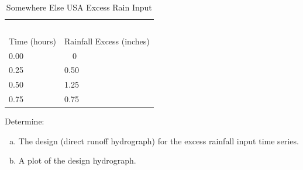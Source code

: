 \documentclass[12pt]{article}
\begin{document}
\begin{enumerate}
\begin{table}[h!]
\centering
\caption{Somewhere Else USA Excess Rain Input}
\begin{tabular}{p{2.0in}p{2.0in}} %
~&~\\
Time (hours) & Rainfall Excess (inches) \\
\hline
\hline
0.00 & ~~0 \\
0.25 & 0.50 \\
0.50 & 1.25 \\
0.75 & 0.75 \\
\hline
\end{tabular}
\label{tab:SomewhereElseUSAExcessRain}
\end{table}

Determine:
    \begin{enumerate}[a)]
        \item The design (direct runoff hydrograph) for the excess rainfall input time series.
        \item A plot of the design hydrograph.
    \end{enumerate}

\end{enumerate}
\end{document}
